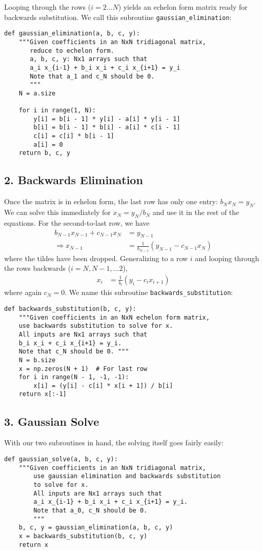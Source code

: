 \documentclass[12pt,a4paper,twoside]{article}
\begin{document}
Looping through the rows ($i=2...N$) yields an echelon form matrix ready for backwards substitution. We call this subroutine \verb|gaussian_elimination|:
\begin{verbatim}
def gaussian_elimination(a, b, c, y):
    """Given coefficients in an NxN tridiagonal matrix,
       reduce to echelon form.
       a, b, c, y: Nx1 arrays such that
       a_i x_{i-1} + b_i x_i + c_i x_{i+1} = y_i
       Note that a_1 and c_N should be 0.
       """
    N = a.size

    for i in range(1, N):
        y[i] = b[i - 1] * y[i] - a[i] * y[i - 1]
        b[i] = b[i - 1] * b[i] - a[i] * c[i - 1]
        c[i] = c[i] * b[i - 1]
        a[i] = 0
    return b, c, y
\end{verbatim}

\subsection*{2. Backwards Elimination}
Once the matrix is in echelon form, the last row has only one entry: $b_Nx_N=y_N$. We can solve this immediately for $x_N=y_N/b_N$ and use it in the rest of the equations. For the second-to-last row, we have
\begin{align*}
b_{N-1}x_{N-1}+c_{N-1}x_N&=y_{N-1}\\
\Rightarrow x_{N-1}&=\frac1{b_{N-1}}(y_{N-1}-c_{N-1}x_N)
\end{align*}
where the tildes have been dropped. Generalizing to a row $i$ and looping through the rows backwards ($i=N, N-1,...2$),
\begin{align*}
x_i&=\frac1{b_i}(y_i-c_ix_{i+1})
\end{align*}
where again $c_N=0$. We name this subroutine \verb|backwards_substitution|:
\begin{verbatim}
def backwards_substitution(b, c, y):
    """Given coefficients in an NxN echelon form matrix,
    use backwards substitution to solve for x.
    All inputs are Nx1 arrays such that
    b_i x_i + c_i x_{i+1} = y_i.
    Note that c_N should be 0. """
    N = b.size
    x = np.zeros(N + 1)  # For last row
    for i in range(N - 1, -1, -1):
        x[i] = (y[i] - c[i] * x[i + 1]) / b[i]
    return x[:-1]
\end{verbatim}

\subsection*{3. Gaussian Solve}
With our two subroutines in hand, the solving itself goes fairly easily:
\begin{verbatim}
def gaussian_solve(a, b, c, y):
    """Given coefficients in an NxN tridiagonal matrix,
        use gaussian elimination and backwards substitution
        to solve for x.
        All inputs are Nx1 arrays such that
        a_i x_{i-1} + b_i x_i + c_i x_{i+1} = y_i.
        Note that a_0, c_N should be 0.
        """
    b, c, y = gaussian_elimination(a, b, c, y)
    x = backwards_substitution(b, c, y)
    return x
\end{verbatim}
\end{document}
